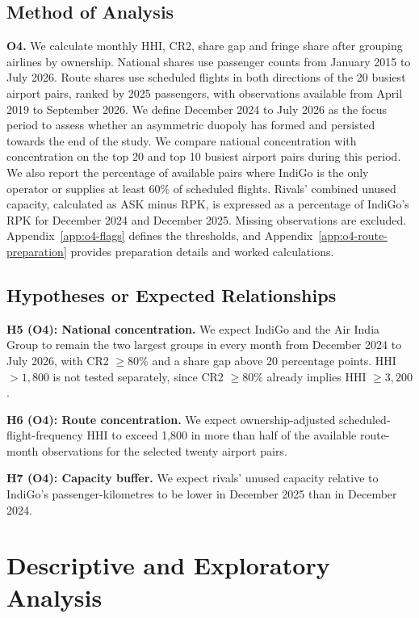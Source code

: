 \documentclass[12pt,a4paper]{article}
\begin{document}
\subsection{Method of Analysis}
\textbf{O4.} We calculate monthly HHI, CR2, share gap and fringe share after grouping airlines by ownership. National shares use passenger counts from January 2015 to July 2026. Route shares use scheduled flights in both directions of the 20 busiest airport pairs, ranked by 2025 passengers, with observations available from April 2019 to September 2026. We define December 2024 to July 2026 as the focus period to assess whether an asymmetric duopoly has formed and persisted towards the end of the study. We compare national concentration with concentration on the top 20 and top 10 busiest airport pairs during this period. We also report the percentage of available pairs where IndiGo is the only operator or supplies at least 60\% of scheduled flights. Rivals' combined unused capacity, calculated as ASK minus RPK, is expressed as a percentage of IndiGo's RPK for December 2024 and December 2025. Missing observations are excluded. Appendix~\ref{app:o4-flags} defines the thresholds, and Appendix~\ref{app:o4-route-preparation} provides preparation details and worked calculations.

\subsection{Hypotheses or Expected Relationships}
\label{sec:hypotheses}
\textbf{H5 (O4): National concentration.} We expect IndiGo and the Air India Group to remain the two largest groups in every month from December 2024 to July 2026, with CR2 $\geq80\%$ and a share gap above 20 percentage points. HHI $>1{,}800$ is not tested separately, since CR2 $\geq80\%$ already implies HHI $\geq3{,}200$.

\textbf{H6 (O4): Route concentration.} We expect ownership-adjusted scheduled-flight-frequency HHI to exceed 1,800 in more than half of the available route-month observations for the selected twenty airport pairs.

\textbf{H7 (O4): Capacity buffer.} We expect rivals' unused capacity relative to IndiGo's passenger-kilometres to be lower in December 2025 than in December 2024.

\clearpage
\section{Descriptive and Exploratory Analysis}
\end{document}

